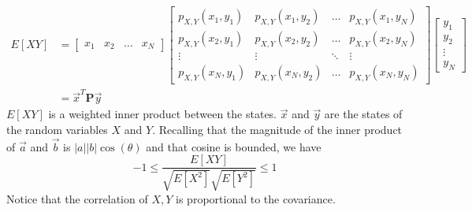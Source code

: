 \begin{align}
    E[XY] & = \begin{bmatrix}
                  x_1   &
                  x_2   &
                  \dots &
                  x_N
              \end{bmatrix}
    \begin{bmatrix}
        p_{X,Y}(x_1, y_1) & p_{X,Y}(x_1, y_2) & \dots  & p_{X,Y}(x_1, y_N) \\
        p_{X,Y}(x_2, y_1) & p_{X,Y}(x_2, y_2) & \dots  & p_{X,Y}(x_2, y_N) \\
        \vdots            & \vdots            & \ddots & \vdots            \\
        p_{X,Y}(x_N, y_1) & p_{X,Y}(x_N, y_2) & \dots  & p_{X,Y}(x_N, y_N)
    \end{bmatrix}
    \begin{bmatrix}
        y_1    \\
        y_2    \\
        \vdots \\
        y_N
    \end{bmatrix}                         \\
          & = \vec{x}^T \mathbf{P} \vec{y}
\end{align}
$E[XY]$ is a weighted inner product between the
states. $\vec{x}$ and $\vec{y}$ are the states of
the random variables $X$ and $Y$. Recalling that the
magnitude of the inner product of $\vec{a}$ and $\vec{b}$
is $|a||b|\cos(\theta)$ and that cosine is bounded, we have
\begin{equation}
    -1 \leq \frac{E[XY]}{\sqrt{E[X^2]}\sqrt{E[Y^2]}} \leq 1
\end{equation}
Notice that the correlation of $X,Y$ is
proportional to the covariance.